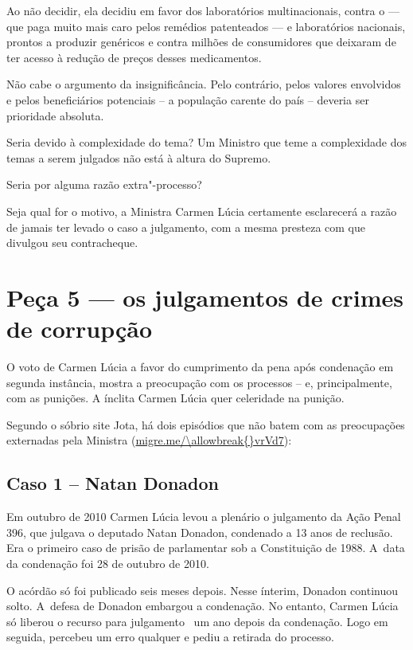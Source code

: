 Ao não decidir, ela decidiu em favor dos laboratórios multinacionais,
contra o  --- que paga muito mais caro pelos remédios patenteados ---
e laboratórios nacionais, prontos a produzir genéricos e contra milhões
de consumidores que deixaram de ter acesso à redução de preços desses
medicamentos.

Não cabe o argumento da insignificância. Pelo contrário, pelos valores
envolvidos e pelos beneficiários potenciais -- a população carente do
país -- deveria ser prioridade absoluta.

Seria devido à complexidade do tema? Um Ministro que teme a complexidade
dos temas a serem julgados não está à altura do Supremo.

Seria por alguma razão extra"-processo?

Seja qual for o motivo, a Ministra Carmen Lúcia certamente esclarecerá a
razão de jamais ter levado o caso a julgamento, com a mesma presteza com
que divulgou seu contracheque.

\section{Peça 5 --- os julgamentos de crimes de corrupção}

O voto de Carmen Lúcia a favor do cumprimento da pena após condenação em
segunda instância, mostra a preocupação com os processos -- e,
principalmente, com as punições. A ínclita Carmen Lúcia quer celeridade
na punição.

Segundo o sóbrio site Jota, há dois episódios que não batem com as
preocupações externadas pela Ministra (\url{migre.me/\allowbreak{}vrVd7}):

\subsection{Caso 1 -- Natan Donadon}

Em outubro de 2010 Carmen Lúcia levou a plenário o julgamento da Ação
Penal 396, que julgava o deputado Natan Donadon, condenado a 13 anos de
reclusão. Era o primeiro caso de prisão de parlamentar sob a
Constituição de 1988. A~data da condenação foi 28 de outubro de 2010.

O acórdão só foi publicado seis meses depois. Nesse ínterim, Donadon
continuou solto. A~defesa de Donadon embargou a condenação. No entanto,
Carmen Lúcia só liberou o recurso para julgamento ~um ano depois da
condenação. Logo em seguida, percebeu um erro qualquer e pediu a
retirada do processo.

